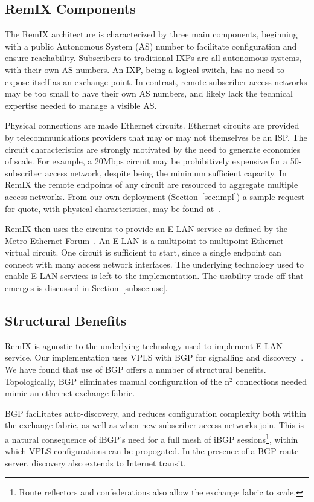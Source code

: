 \subsection{RemIX Components}

The RemIX architecture is characterized by three main components, beginning with
a public Autonomous System (AS) number to facilitate configuration and ensure
reachability. Subscribers to traditional IXPs are all autonomous systems, with
their own AS numbers. An IXP, being a logical switch, has no need to expose
itself as an exchange point. In contrast, remote subscriber access networks may
be too small to have their own AS numbers, and likely lack the technical
expertise needed to manage a visible AS. 

Physical connections are made Ethernet circuits. Ethernet circuits are provided
by telecommunications providers that may or may not themselves be an ISP. The
circuit characteristics are strongly motivated by the need to generate economies
of scale. For example, a 20Mbps circuit may be prohibitively expensive for a
50-subscriber access network, despite being the minimum sufficient capacity. In
RemIX the remote endpoints of any circuit are resourced to aggregate multiple
access networks. From our own deployment (Section~\ref{sec:impl}) a sample
request-for-quote, with physical characteristics, may be found at~\cite{rfq}.

RemIX then uses the circuits to provide an E-LAN service as defined by the Metro
Ethernet Forum~\cite{mef62}. An E-LAN is a multipoint-to-multipoint Ethernet
virtual circuit. One circuit is sufficient to start, since a single endpoint can
connect with many access network interfaces. The underlying technology used to
enable E-LAN services is left to the implementation. The usability trade-off that emerges is discussed in Section~\ref{subsec:use}.

\subsection{Structural Benefits}

RemIX is agnostic to the underlying technology used to implement E-LAN service.
Our implementation uses VPLS with BGP for signalling and
discovery~\cite{vpls-bgp}. We have found that use of BGP offers a number of
structural benefits. Topologically, BGP eliminates manual configuration of the
n$^2$ connections needed mimic an ethernet exchange fabric.

BGP facilitates auto-discovery, and reduces configuration complexity both within
the exchange fabric, as well as when new subscriber access networks join. This
is a natural consequence of iBGP's need for a full mesh of iBGP
sessions\footnote{Route reflectors and confederations also allow the exchange
fabric to scale.}, within which VPLS configurations can be propogated. In the
presence of a BGP route server, discovery also extends to Internet transit.

